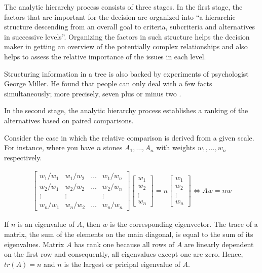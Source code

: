 The analytic hierarchy process consists of three stages. In the first stage, the factors that are important for the decision are organized into ``a hierarchic structure descending from an overall goal to criteria, subcriteria and alternatives in successive levels''. Organizing the factors in such structure helps the decision maker in getting an overview of the potentially complex relationships and also helps to assess the relative importance of the issues in each level. 

Structuring information in a tree is also backed by experiments of psychologist George Miller. He found that people can only deal with a few facts simultaneously; more precisely, seven plus or minus two \cite{Miller:1956}. 

In the second stage, the analytic hierarchy process establishes a ranking of the alternatives based on paired comparisons. 


Consider the case in which the relative comparison is derived from a given scale. For instance, where you have $n$ stones $A_1, \ldots, A_n$ with weights $w_1, \ldots, w_n$ respectively. 

\begin{gather}
    \begin{bmatrix}
        w_1/w_1 & w_1/w_2 & \ldots & w_1/w_n \\
        w_2/w_1 & w_2/w_2 & \ldots & w_2/w_n \\
        \vdots  & \vdots  &        & \vdots  \\
        w_n/w_1 & w_n/w_2 & \ldots & w_n/w_n    
    \end{bmatrix} %
    \begin{bmatrix}
        w_1    \\
        w_2    \\
        \vdots \\
        w_n
    \end{bmatrix} = %
    n %
    \begin{bmatrix}
        w_1    \\
        w_2    \\
        \vdots \\
        w_n
    \end{bmatrix} \Longleftrightarrow %
    Aw = nw
    \label{eq:ahp}
\end{gather}

If $n$ is an eigenvalue of $A$, then $w$ is the corresponding eigenvector. The trace of a matrix, the sum of the elements on the main diagonal, is equal to the sum of its eigenvalues. Matrix $A$ has rank one because all rows of $A$ are linearly dependent on the first row and consequently, all eigenvalues except one are zero. Hence, $tr(A) = n$ and $n$ is the largest or pricipal eigenvalue of $A$.

